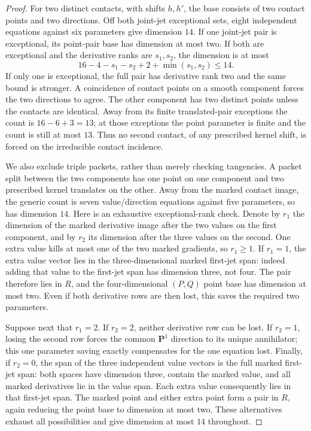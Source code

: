 \begin{proof}
For two distinct contacts, with shifts $h,h'$, the base consists
of two contact points and two directions. Off both joint-jet
exceptional sets, eight independent equations against six
parameters give dimension $14$. If one joint-jet pair is
exceptional, its point-pair base has dimension at most two.
If both are exceptional and the derivative ranks are $s_1,s_2$,
the dimension is at most
\[
       16-4-s_1-s_2+2+\min(s_1,s_2)\le14.        \tag{N9.1}
\]
If only one is exceptional, the full pair has derivative rank two
and the same bound is stronger. A coincidence of contact points
on a smooth component forces the two directions to agree.
The other component has two distinct points unless the contacts
are identical. Away from its finite translated-pair exceptions
the count is $16-6+3=13$; at those exceptions the point parameter
is finite and the count is still at most $13$.
Thus no second contact, of any prescribed kernel shift, is forced
on the irreducible contact incidence.

We also exclude triple packets, rather than merely checking
tangencies. A packet split between the two components has one
point on one component and two prescribed kernel translates on
the other. Away from the marked contact image, the generic count
is seven value/direction equations against five parameters, so
has dimension $14$. Here is an exhaustive exceptional-rank check. Denote by $r_1$
the dimension of the marked derivative image after the two values
on the first component, and by $r_2$ its dimension after the three
values on the second. One extra value kills at most one of the
two marked gradients, so $r_1\ge1$. If $r_1=1$, the extra value
vector lies in the three-dimensional marked first-jet span:
indeed adding that value to the first-jet span has dimension three,
not four. The pair therefore lies in $R$, and the four-dimensional
$(P,Q)$ point base has dimension at most two. Even if both
derivative rows are then lost, this saves the required two
parameters.

Suppose next that $r_1=2$. If $r_2=2$, neither derivative row can
be lost. If $r_2=1$, losing the second row forces the common
$\mathbf P^1$ direction to its unique annihilator; this one
parameter saving exactly compensates for the one equation lost.
Finally, if $r_2=0$, the span of the three independent value
vectors is the full marked first-jet span: both spaces have
dimension three, contain the marked value, and all marked
derivatives lie in the value span. Each extra value consequently
lies in that first-jet span. The marked point and either extra
point form a pair in $R$, again reducing the point base to
dimension at most two. These alternatives exhaust all possibilities
and give dimension at most $14$ throughout.


\end{proof}
